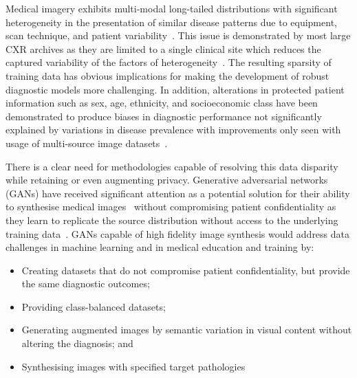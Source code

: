 \documentclass{article}
\begin{document}
Medical imagery exhibits multi-modal long-tailed distributions with significant heterogeneity in the presentation of similar disease patterns due to equipment, scan technique, and patient
variability~\cite{zhouReviewDeepLearning2020}. This issue is demonstrated by most large CXR archives as they are limited to a single clinical site which reduces the captured variability of the factors of heterogeneity~\cite{zhouReviewDeepLearning2020}. The resulting sparsity of training data has obvious implications for making the development of robust diagnostic models more challenging. In addition, alterations in protected patient information such as sex, age, ethnicity, and socioeconomic class have been demonstrated to produce biases in diagnostic performance not significantly explained by variations in disease prevalence with improvements only seen with usage of multi-source image datasets~\cite{seyyed-kalantariCheXclusionFairnessGaps2020}. 

There is a clear need for methodologies capable of resolving this data disparity while retaining or even augmenting privacy. Generative adversarial networks (GANs) have received significant attention as a potential solution for their ability to synthesise medical images~\cite{beersHighresolutionMedicalImage2018,salehinejadSynthesizingChestXRay2019a,togoSyntheticGastritisImage2019} without compromising patient confidentiality as they learn to replicate the source distribution without access to the underlying training data~\cite{yiGenerativeAdversarialNetwork2019}. GANs capable of high fidelity image synthesis would address data challenges in machine learning and in medical education and training by:
\begin{itemize}
\item Creating datasets that do not compromise patient confidentiality, but provide the same diagnostic outcomes;
\item Providing class-balanced datasets; 
\item Generating augmented images by semantic variation in visual content without altering the diagnosis; and
\item Synthesising images with specified target pathologies
\end{itemize}
\end{document}
